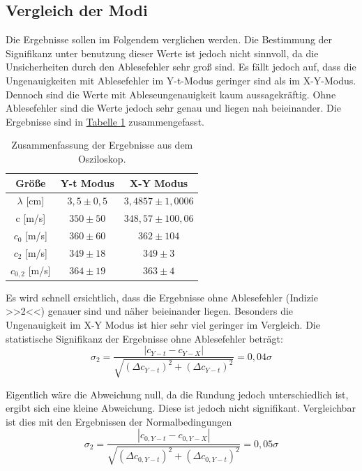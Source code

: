 \subsection{Vergleich der Modi}
Die Ergebnisse sollen im Folgendem verglichen werden. Die Bestimmung der Signifikanz unter benutzung dieser Werte ist jedoch nicht sinnvoll, da die Unsicherheiten durch den Ablesefehler sehr groß sind. Es fällt jedoch auf, dass die Ungenauigkeiten mit Ablesefehler im Y-t-Modus geringer sind als im X-Y-Modus. Dennoch sind die Werte mit Ableseungenauigkeit kaum aussagekräftig. Ohne Ablesefehler sind die Werte jedoch sehr genau und liegen nah beieinander. Die Ergebnisse sind in \hyperref[tab:vergleich_modus]{Tabelle \ref*{tab:vergleich_modus}} zusammengefasst.
\begin{table}[!ht]
    \centering
    \begin{tabular}{c | c | c}
        \toprule
        Größe & Y-t Modus & X-Y Modus \\
        \hline
        $\lambda$ [cm] & $3,5 \pm 0,5$ & $3,4857 \pm 1,0006$ \\
        \midrule
        c [m/s] & $350 \pm 50$ & $348,57 \pm 100,06$ \\
        $c_0$ [m/s] & $360 \pm 60$ & $362 \pm 104$ \\
        \midrule
        $c_2$ [m/s] & $349 \pm 18$ & $349 \pm 3$ \\
        $c_{0,2}$ [m/s] & $364 \pm 19$ & $363 \pm 4$ \\
        \bottomrule
    \end{tabular}
    \caption{Zusammenfassung der Ergebnisse aus dem Osziloskop.}
    \label{tab:vergleich_modus}
\end{table}

Es wird schnell ersichtlich, dass die Ergebnisse ohne Ablesefehler (Indizie >>2<<) genauer sind und näher beieinander liegen. Besonders die Ungenauigkeit im X-Y Modus ist hier sehr viel geringer im Vergleich. Die statistische Signifikanz der Ergebnisse ohne Ablesefehler beträgt:
\begin{equation}
    \sigma_2 = \frac{\left| c_{Y-t} - c_{Y-X} \right|}{\sqrt{(\Delta c_{Y-t})^2 + (\Delta c_{Y-t})^2}} = 0,04\sigma
\end{equation}

Eigentlich wäre die Abweichung null, da die Rundung jedoch unterschiedlich ist, ergibt sich eine kleine Abweichung. Diese ist jedoch nicht signifikant. Vergleichbar ist dies mit den Ergebnissen der Normalbedingungen
\begin{equation}
    \sigma_2 = \frac{\left| c_{0,Y-t} - c_{0,Y-X} \right|}{\sqrt{(\Delta c_{0,Y-t})^2 + (\Delta c_{0,Y-t})^2}} = 0,05\sigma
\end{equation}

